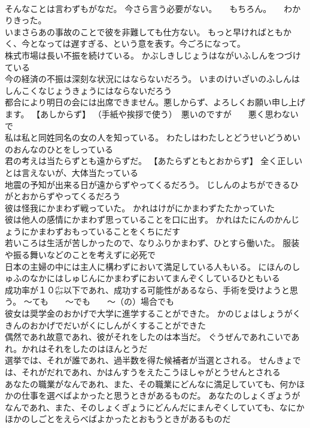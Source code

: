 \documentclass[8pt]{extreport}
\begin{document}
\begin{CJK}{UTF8}{min}
\\	そんなことは言わずもがなだ。	今さら言う必要がない。　　もちろん。　　わかりきった。
\\	いまさらあの事故のことで彼を非難しても仕方ない。	もっと早ければともかく、今となっては遅すぎる、という意を表す。今ごろになって。
\\	株式市場は長い不振を続けている。	かぶしきしじょうはながいふしんをつづけている 
\\	今の経済の不振は深刻な状況にはならないだろう。	いまのけいざいのふしんはしんこくなじょうきょうにはならないだろう 
\\	都合により明日の会には出席できません。悪しからず、よろしくお願い申し上げます。	【あしからず】 （手紙や挨拶で使う）　悪いのですが　　悪く思わないで
\\	私は私と同姓同名の女の人を知っている。	わたしはわたしとどうせいどうめいのおんなのひとをしっている 
\\	君の考えは当たらずとも遠からずだ。	【あたらずともとおからず】 全く正しいとは言えないが、大体当たっている
\\	地震の予知が出来る日が遠からずやってくるだろう。	じしんのよちができるひがとおからずやってくるだろう 
\\	彼は怪我にかまわず戦っていた。	かれはけがにかまわずたたかっていた 
\\	彼は他人の感情にかまわず思っていることを口に出す。	かれはたにんのかんじょうにかまわずおもっていることをくちにだす 
\\	若いころは生活が苦しかったので、なりふりかまわず、ひとすら働いた。	服装や振る舞いなどのことを考えずに必死で
\\	日本の主婦の中には主人に構わずにおいて満足している人もいる。	にほんのしゅふのなかにはしゅじんにかまわずにおいてまんぞくしているひともいる 
\\	成功率が１０㌫以下であれ、成功する可能性があるなら、手術を受けようと思う。	～ても　　～でも　　～（の）場合でも
\\	彼女は奨学金のおかげで大学に進学することができた。	かのじょはしょうがくきんのおかげでだいがくにしんがくすることができた 
\\	偶然であれ故意であれ、彼がそれをしたのは本当だ。	ぐうぜんであれこいであれ。かれはそれをしたのはほんとうだ 
\\	選挙では、それが誰であれ、過半数を得た候補者が当選とされる。	せんきょでは、それがだれであれ、かはんすうをえたこうほしゃがとうせんとされる 
\\	あなたの職業がなんであれ、また、その職業にどんなに満足していても、何かほかの仕事を選べばよかったと思うときがあるものだ。	あなたのしょくぎょうがなんであれ、また、そのしょくぎょうにどんんだにまんぞくしていても、なにかほかのしごとをえらべばよかったとおもうときがあるものだ 

\end{CJK}
\end{document}

